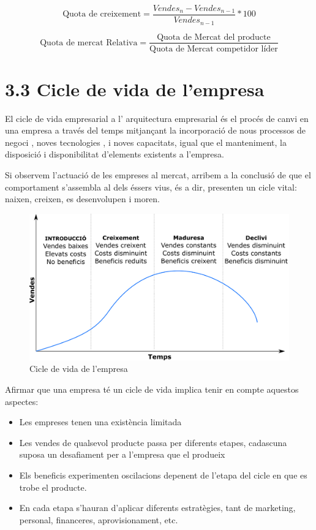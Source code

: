 \documentclass[
]{book}
\providecommand{\tightlist}{%
  \setlength{\itemsep}{0pt}\setlength{\parskip}{0pt}}
\begin{document}
\[ \begin{equation}
\mbox{Quota de creixement}=\frac{Vendes_{n}-Vendes_{n-1}}{Vendes_{n-1}}*100
\end{equation}
\]

\[
\mbox{Quota de mercat Relativa}=\frac{\mbox{Quota de Mercat del producte}}{\mbox{Quota de Mercat competidor líder}}
\]

\hypertarget{cicle-de-vida-de-lempresa}{%
\section*{3.3 Cicle de vida de l'empresa}\label{cicle-de-vida-de-lempresa}}

El cicle de vida empresarial a l' arquitectura empresarial és el procés de canvi en una empresa a través del temps mitjançant la incorporació de nous processos de negoci , noves tecnologies , i noves capacitats, igual que el manteniment, la disposició i disponibilitat d'elements existents a l'empresa.

Si observem l'actuació de les empreses al mercat, arribem a la conclusió de que el comportament s'assembla al dels éssers vius, és a dir, presenten un cicle vital: naixen, creixen, es desenvolupen i moren.

\begin{figure}
\includegraphics[width=1\linewidth]{cicle} \caption{Cicle de vida de l'empresa}\label{fig:unnamed-chunk-4}
\end{figure}

Afirmar que una empresa té un cicle de vida implica tenir en compte aquestos aspectes:

\begin{itemize}
\tightlist
\item
  Les empreses tenen una existència limitada
\item
  Les vendes de qualsevol producte passa per diferents etapes, cadascuna suposa un desafiament per a l'empresa que el produeix
\item
  Els beneficis experimenten oscilacions depenent de l'etapa del cicle en que es trobe el producte.
\item
  En cada etapa s'hauran d'aplicar diferents estratègies, tant de marketing, personal, financeres, aprovisionament, etc.
\end{itemize}
\end{document}

